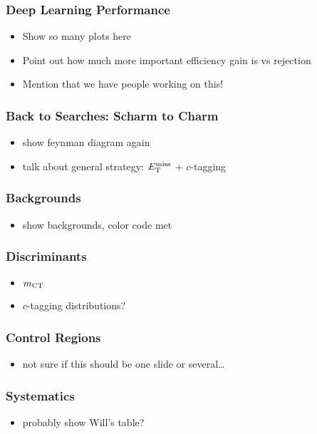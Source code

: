 \documentclass[usenames,dvipsnames]{beamer}
\begin{document}
\begin{frame}
  \frametitle{Deep Learning Performance}
  \begin{itemize}
  \item Show so many plots here
  \item Point out how much more important efficiency gain is vs rejection
  \item Mention that we have people working on this!
  \end{itemize}
\end{frame}

\begin{frame}
  \frametitle{Back to Searches: Scharm to Charm}
  \begin{itemize}
  \item show feynman diagram again
  \item talk about general strategy: $E_{\rm T}^{\rm miss}$ + $c$-tagging
  \end{itemize}
\end{frame}

\begin{frame}
  \frametitle{Backgrounds}
  \begin{itemize}
  \item show backgrounds, color code met
  \end{itemize}
\end{frame}

\begin{frame}
  \frametitle{Discriminants}
  \begin{itemize}
  \item $m_{\rm CT}$
  \item $c$-tagging distributions?
  \end{itemize}
\end{frame}

\begin{frame}
  \frametitle{Control Regions}
  \begin{itemize}
  \item not sure if this should be one slide or several\ldots
  \end{itemize}
\end{frame}

\begin{frame}
  \frametitle{Systematics}
  \begin{itemize}
  \item probably show Will's table?
  \end{itemize}
\end{frame}
\end{document}

